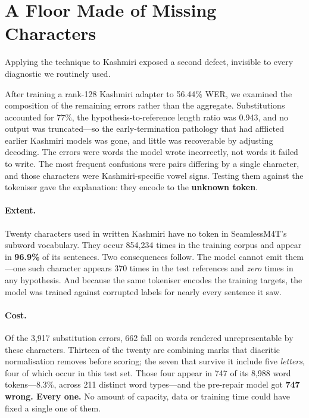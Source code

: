\documentclass[sigconf,anonymous,review]{acmart}
\begin{document}
\section{A Floor Made of Missing Characters}
\label{sec:vocab}

Applying the technique to Kashmiri exposed a second defect, invisible to every
diagnostic we routinely used.

After training a rank-128 Kashmiri adapter to 56.44\% WER, we examined the
composition of the remaining errors rather than the aggregate. Substitutions
accounted for 77\%, the hypothesis-to-reference length ratio was 0.943, and no
output was truncated---so the early-termination pathology that had afflicted
earlier Kashmiri models was gone, and little was recoverable by adjusting
decoding. The errors were words the model wrote incorrectly, not words it failed
to write. The most frequent confusions were pairs differing by a single
character, and those characters were Kashmiri-specific vowel signs. Testing them
against the tokeniser gave the explanation: they encode to the \textbf{unknown
token}.

\paragraph{Extent.} Twenty characters used in written Kashmiri have no token in
SeamlessM4T's subword vocabulary. They occur 854{,}234 times in the training
corpus and appear in \textbf{96.9\%} of its sentences. Two consequences follow.
The model cannot emit them---one such character appears 370 times in the test
references and \emph{zero} times in any hypothesis. And because the same
tokeniser encodes the training targets, the model was trained against corrupted
labels for nearly every sentence it saw.

\paragraph{Cost.} Of the 3{,}917 substitution errors, 662 fall on words rendered
unrepresentable by these characters. Thirteen of the twenty are combining marks
that diacritic normalisation removes before scoring; the seven that survive it
include five \emph{letters}, four of which occur in this test set. Those four
appear in 747 of its 8{,}988 word tokens---8.3\%, across 211 distinct word
types---and the pre-repair model got \textbf{747 wrong. Every one.} No amount of
capacity, data or training time could have fixed a single one of them.
\end{document}
